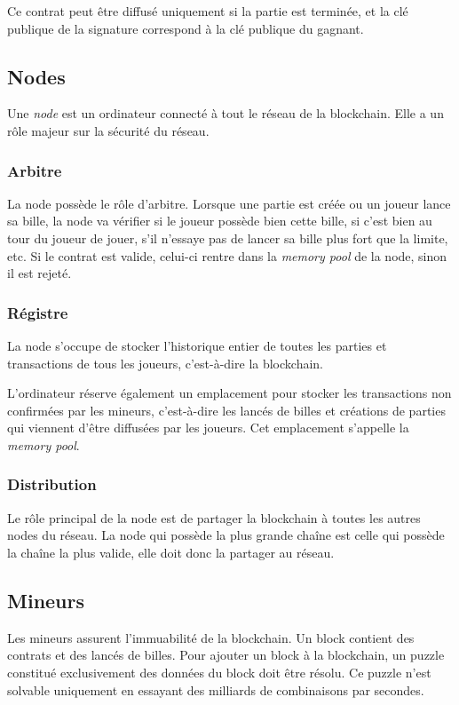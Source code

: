 \documentclass{article}
\begin{document}
Ce contrat peut être diffusé uniquement si la partie est terminée, et la clé publique de la signature correspond à la clé publique du gagnant.

\subsection{Nodes}
Une \textit{node} est un ordinateur connecté à tout le réseau de la blockchain. Elle a un rôle majeur sur la sécurité du réseau.

\subsubsection{Arbitre}
La node possède le rôle d'arbitre.
Lorsque une partie est créée ou un joueur lance sa bille, la node va vérifier si le joueur possède bien cette bille, si c'est bien au tour du joueur de jouer, s'il n'essaye pas de lancer sa bille plus fort que la limite, etc.
Si le contrat est valide, celui-ci rentre dans la \textit{memory pool} de la node, sinon il est rejeté.

\subsubsection{Régistre}
La node s'occupe de stocker l'historique entier de toutes les parties et transactions de tous les joueurs, c'est-à-dire la blockchain.

L'ordinateur réserve également un emplacement pour stocker les transactions non confirmées par les mineurs, c'est-à-dire les lancés de billes et créations de parties qui viennent d'être diffusées par les joueurs. Cet emplacement s'appelle la \textit{memory pool}.

\subsubsection{Distribution}
Le rôle principal de la node est de partager la blockchain à toutes les autres nodes du réseau. 
La node qui possède la plus grande chaîne est celle qui possède la chaîne la plus valide, elle doit donc la partager au réseau.

\subsection{Mineurs}
Les mineurs assurent l'immuabilité de la blockchain.
Un block contient des contrats et des lancés de billes. Pour ajouter un block à la blockchain, un puzzle constitué exclusivement des données du block doit être résolu. Ce puzzle n'est solvable uniquement en essayant des milliards de combinaisons par secondes.
\end{document}
